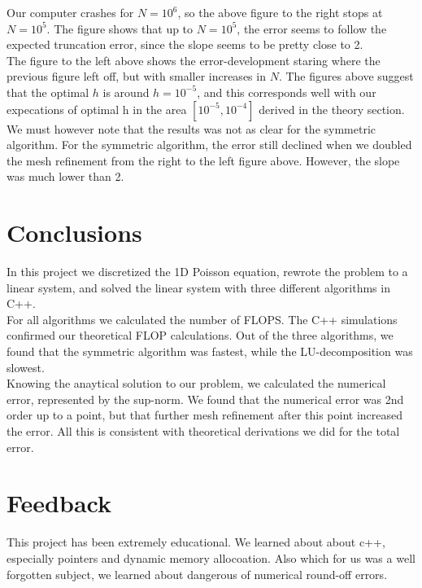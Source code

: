 \documentclass{article}
\begin{document}
Our computer crashes for $N = 10^6$, so the above figure to the right stops at $N = 10^5$. The figure shows that up to $N = 10^5$, the error seems to follow the expected truncation error, since the slope seems to be pretty close to 2.\\

The figure to the left above shows the error-development staring where the previous figure left off, but with smaller increases in $N$. The figures above suggest that the optimal $h$ is around $h = 10^{-5}$, and this corresponds well with our expecations of optimal h in the area $[10^{-5}, 10^{-4}]$ derived in the theory section.\\
 
We must however note that the results was not as clear for the symmetric algorithm. For the symmetric algorithm, the error still declined when we doubled the mesh refinement from the right to the left figure above. However, the slope was much lower than 2.

\section{Conclusions}
In this project we discretized the 1D Poisson equation, rewrote the problem to a linear system, and solved the linear system with three different algorithms in C++.\\

For all algorithms we calculated the number of FLOPS. The C++ simulations confirmed our theoretical FLOP calculations. Out of the three algorithms, we found that the symmetric algorithm was fastest, while the LU-decomposition was slowest. \\

Knowing the anaytical solution to our problem, we calculated the numerical error, represented by the sup-norm. We found that the numerical error was 2nd order up to a point, but that further mesh refinement after this point increased the error. All this is consistent with theoretical derivations we did for the total error. 

\section{Feedback}
This project has been extremely educational. We learned about about c++, especially pointers and dynamic memory allocoation. Also which for us was a well forgotten subject, we learned about dangerous of numerical round-off errors. \\
\end{document}
